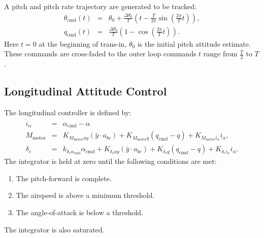 \documentclass{article}
\newcommand{\alphacmd}{\alpha_\textrm{cmd}}
\newcommand{\thetacmd}{\theta_\textrm{cmd}}
\newcommand{\qcmd}{q_\textrm{cmd}}
\newcommand{\Mmotor}{M_\textrm{motor}}
\begin{document}
A pitch and pitch rate trajectory are generated to be tracked:
\begin{eqnarray}
\thetacmd(t) &=& \theta_0 + \frac{\Delta\theta_0}{T} \left (
t - \frac{T}{2\pi} \sin\left(\frac{2\pi}T t\right)
\right), \\
\qcmd(t) &=& \frac{\Delta\theta_0}{T} \left(1 - \cos\left(\frac{2 \pi}T t\right)\right).
\end{eqnarray}
Here $t = 0$ at the beginning of trans-in, $\theta_0$ is the initial
pitch attitude estimate.  These commands are cross-faded to the outer
loop commands $t$ range from $\frac{T}2$ to $T$.

\subsection{Longitudinal Attitude Control}
The longitudinal controller is defined by:
\begin{eqnarray}
\dot i_\alpha &=& \alphacmd - \alpha \\
\Mmotor &=& K_{\Mmotor ay} (\hat y \cdot a_{bc}) + K_{\Mmotor q}(\qcmd - q) + K_{\Mmotor i_\alpha} i_\alpha,\\
\delta_e &=& k_{\delta_e\alphacmd} \alphacmd + K_{\delta_e ay} (\hat y \cdot a_{bc}) + K_{\delta_e q}(\qcmd - q) + K_{\delta_e i_\alpha} i_\alpha.
\end{eqnarray}
The integrator is held at zero until the following
conditions are met:
\begin{enumerate}
\item The pitch-forward is complete.
\item The airspeed is above a minimum threshold.
\item The angle-of-attack is below a threshold.
\end{enumerate}
The integrator is also saturated.
\end{document}
